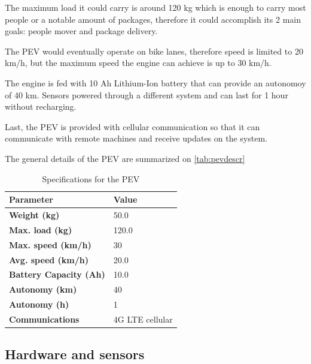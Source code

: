 The maximum load it could carry is around 120 kg which is enough to carry most people or a notable amount of packages, therefore it could accomplish its 2 main goals: people mover and package delivery.

The PEV would eventually operate on bike lanes, therefore speed is limited to 20 km/h, but the maximum speed the engine can achieve is up to 30 km/h.

The engine is fed with 10 Ah Lithium-Ion battery that can provide an autonomoy of 40 km. Sensors powered through a different system and can last for 1 hour without recharging.

Last, the PEV is provided with cellular communication so that it can communicate with remote machines and receive updates on the system.

The general details of the PEV are summarized on \autoref{tab:pevdescr}
\begin{table}[h!]
  \centering
  \begin{tabular}{ll}
    \hline
    \textbf{Parameter}             & \textbf{Value}  \\ \hline
    \textbf{Weight (kg)}           & 50.0            \\ \hline
    \textbf{Max. load (kg)}        & 120.0           \\ \hline
    \textbf{Max. speed (km/h)}     & 30              \\ \hline
    \textbf{Avg. speed (km/h)}     & 20.0            \\ \hline
    \textbf{Battery Capacity (Ah)} & 10.0            \\ \hline
    \textbf{Autonomy (km)}         & 40              \\ \hline
    \textbf{Autonomy (h)}          & 1               \\ \hline
    \textbf{Communications}        & 4G LTE cellular \\ \hline
  \end{tabular}
  \caption{Specifications for the PEV}
  \label{tab:pevdescr}
\end{table}

\subsection{Hardware and sensors}

